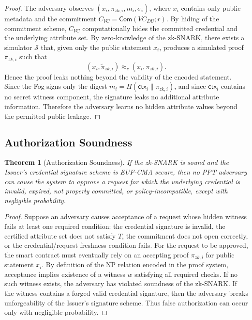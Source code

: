 \documentclass[conference]{IEEEtran}
\newtheorem{theorem}{Theorem}
\begin{document}
\begin{proof}
The adversary observes $(x_i,\pi_{zk,i},m_i,\sigma_i)$, where $x_i$ contains only public metadata and the commitment $C_{VC}=\mathsf{Com}(VC_{DU};r)$. By hiding of the commitment scheme, $C_{VC}$ computationally hides the committed credential and the underlying attribute set. By zero-knowledge of the zk-SNARK, there exists a simulator $\mathcal{S}$ that, given only the public statement $x_i$, produces a simulated proof $\widetilde{\pi}_{zk,i}$ such that
\[
(x_i,\widetilde{\pi}_{zk,i}) \approx_c (x_i,\pi_{zk,i}).
\]
Hence the proof leaks nothing beyond the validity of the encoded statement. Since the Fog signs only the digest $m_i=H(\mathsf{ctx}_i\|\pi_{zk,i})$, and since $\mathsf{ctx}_i$ contains no secret witness component, the signature leaks no additional attribute information. Therefore the adversary learns no hidden attribute values beyond the permitted public leakage.
\end{proof}

\subsection{Authorization Soundness}

\begin{theorem}[Authorization Soundness]
If the zk-SNARK is sound and the Issuer's credential signature scheme is EUF-CMA secure, then no PPT adversary can cause the system to approve a request for which the underlying credential is invalid, expired, not properly committed, or policy-incompatible, except with negligible probability.
\end{theorem}

\begin{proof}
Suppose an adversary causes acceptance of a request whose hidden witness fails at least one required condition: the credential signature is invalid, the certified attribute set does not satisfy $T$, the commitment does not open correctly, or the credential/request freshness condition fails. For the request to be approved, the smart contract must eventually rely on an accepting proof $\pi_{zk,i}$ for public statement $x_i$. By definition of the NP relation encoded in the proof system, acceptance implies existence of a witness $w$ satisfying all required checks. If no such witness exists, the adversary has violated soundness of the zk-SNARK. If the witness contains a forged valid credential signature, then the adversary breaks unforgeability of the Issuer's signature scheme. Thus false authorization can occur only with negligible probability.
\end{proof}
\end{document}
